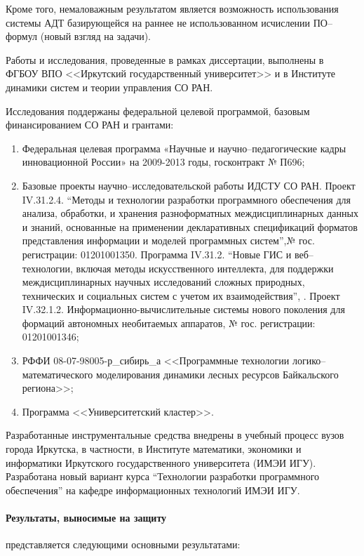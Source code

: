 Кроме того, немаловажным результатом является возможность использования системы АДТ базирующейся на раннее не использованном исчислении ПО--формул (новый взгляд на задачи).

Работы и исследования, проведенные в рамках  диссертации, выполнены в ФГБОУ ВПО <<Иркутский государственный университет>> и в Институте динамики систем и теории управления СО РАН.

Исследования поддержаны федеральной целевой программой, базовым финансированием СО РАН и грантами:
\begin{enumerate}
\item Федеральная целевая программа «Научные и научно--педагогические кадры инновационной России» на 2009-2013 годы, госконтракт № П696;
\item Базовые проекты научно--исследовательской работы ИДСТУ СО РАН. Проект IV.31.2.4. ``Методы и технологии разработки программного обеспечения для анализа, обработки, и хранения разноформатных междисциплинарных данных и знаний, основанные на применении декларативных спецификаций форматов представления информации и моделей программных систем'',№ гос. регистрации: 01201001350. Программа IV.31.2. ``Новые ГИС и веб--технологии, включая методы искусственного интеллекта, для поддержки междисциплинарных научных исследований сложных природных, технических и социальных систем с учетом их взаимодействия'', . Проект IV.32.1.2. Информационно-вычислительные системы нового поколения для формаций автономных необитаемых аппаратов, № гос. регистрации: 01201001346;
\item РФФИ 08-07-98005-р\_сибирь\_а <<Программные технологии логико--математического моделирования динамики лесных ресурсов Байкальского региона>>;
\item Программа <<Университетский кластер>>.
\end{enumerate}

Разработанные инструментальные средства внедрены в учебный процесс вузов города Иркутска, в частности, в Институте математики, экономики и информатики Иркутского государственного университета (ИМЭИ ИГУ). Разработана новый вариант курса ``Технологии разработки программного обеспечения'' на кафедре информационных технологий ИМЭИ ИГУ.

\paragraph{Результаты, выносимые на защиту}\hspace{-1em} представляется следующими основными результатами:

